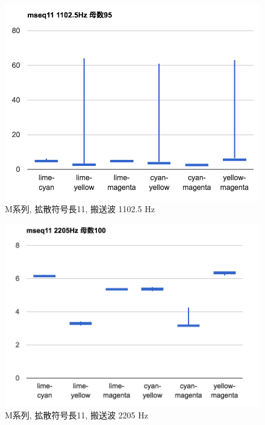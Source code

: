 \begin{figure}[p]
  \centering
  \includegraphics[clip,width=1.05\hsize]{img/m11_1102.png}
  \caption{M系列, 拡散符号長11, 搬送波 1102.5 Hz}\label{fig:m11Z1102}
\end{figure}

\begin{figure}[p]
  \centering
  \includegraphics[clip,width=1.05\hsize]{img/m11_2205.png}
  \caption{M系列, 拡散符号長11, 搬送波 2205 Hz}\label{fig:m11Z2205}
\end{figure}

